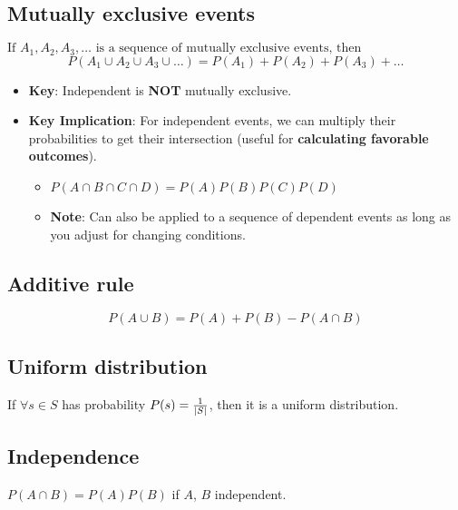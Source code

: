 \documentclass{article}
\begin{document}
\subsection{Mutually exclusive events}
\begin{definition}
    $\text{If } A_1, A_2, A_3, \dots \text{ is a sequence of mutually exclusive events, then}$
    \begin{equation}
        P(A_1 \cup A_2 \cup A_3 \cup \dots) = P(A_1) + P(A_2) + P(A_3) + \dots    
    \end{equation}
    \begin{itemize}
        \item \textbf{Key}: Independent is \textbf{NOT} mutually exclusive.
        \item \textbf{Key Implication}: For independent events, we can multiply their probabilities to get their intersection (useful for \textbf{calculating favorable outcomes}).
        \begin{itemize}
            \item \( P(A \cap B \cap C \cap D) = P(A)P(B)P(C)P(D) \) 
            \item \textbf{Note}: Can also be applied to a sequence of dependent events as long as you adjust for changing conditions.
        \end{itemize}
    \end{itemize}
\end{definition}

\subsection{Additive rule}
    \begin{definition}
        \begin{equation}
            P(A \cup B) = P(A) + P(B) - P(A\cap B)
        \end{equation}
    \end{definition}

\subsection{Uniform distribution}
    \begin{definition}
        If $\forall s\in S$ has probability $P(s) = \frac{1}{\abs{S}}$, then it is a uniform distribution.
    \end{definition}

\subsection{Independence}
    \begin{definition}
        $P(A \cap B) = P(A)P(B)$ if $A$, $B$ independent.
    \end{definition}
\end{document}
